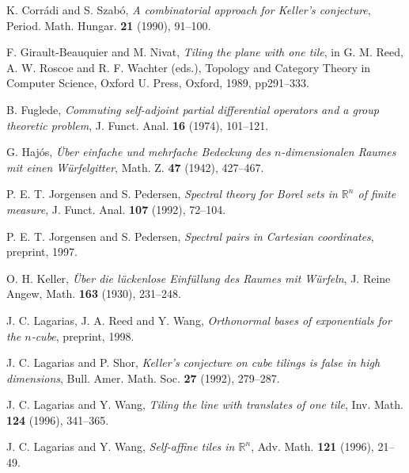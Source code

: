 \documentclass[12pt]{amsart}
\theoremstyle{plain}
\numberwithin{equation}{section}
\newcommand{\R}{\ensuremath{\mathbb{R}}\xspace}
\begin{document}
 


\begin{thebibliography}{ABCD}
 
   K. Corr\'adi and S. Szab\'o,
   \emph{A combinatorial approach for Keller{\rm '}s conjecture},
   Period. Math. Hungar. \textbf{21} (1990), 91--100.

   F. Girault-Beauquier and M. Nivat,
   \emph{Tiling the plane with one tile},
   in G. M. Reed, A. W. Roscoe and R. F. Wachter (eds.),
   Topology and Category Theory in Computer Science,
   Oxford U. Press, Oxford, 1989, pp291--333.

   B. Fuglede,
   \emph{Commuting self-adjoint partial differential operators
   and a group theoretic problem},
   J. Funct. Anal. \textbf{16} (1974), 101--121.
 
   G. Haj\'os,
   \emph{\"Uber einfache und mehrfache Bedeckung des
      $n$-dimensionalen Raumes mit einen W\"urfelgitter},
   Math. Z. \textbf{47} (1942), 427--467.

   P. E. T. Jorgensen and S. Pedersen,
   \emph{Spectral theory for Borel sets in $\R^n$ of
   finite measure},
   J. Funct. Anal. \textbf{107} (1992), 72--104.

   P. E. T. Jorgensen and S. Pedersen,
   \emph{Spectral pairs in Cartesian coordinates},
   preprint, 1997.
 
   O. H. Keller,
   \emph{\"Uber die l\"uckenlose Einf\"ullung des Raumes mit
      W\"urfeln},
   J. Reine Angew, Math. \textbf{163} (1930), 231--248.

   J. C. Lagarias, J. A. Reed and Y. Wang,
   \emph{Orthonormal bases of exponentials for the $n$-cube},
   preprint, 1998.

   J. C. Lagarias and P. Shor,
   \emph{Keller's conjecture on cube tilings is false in high
   dimensions},
   Bull. Amer. Math. Soc. \textbf{27} (1992), 279--287.

   J. C. Lagarias and Y. Wang,
   \emph{Tiling the line with translates of one tile},
   Inv. Math. \textbf{124} (1996), 341--365.
 
   J. C. Lagarias and Y. Wang,
   \emph{Self-affine tiles in $\R^n$},
   Adv. Math. \textbf{121} (1996), 21--49.


\end{thebibliography}
\end{document}
